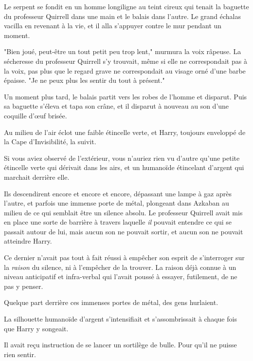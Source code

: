 Le serpent se fondit en un homme longiligne au teint cireux qui tenait la baguette du professeur Quirrell dans une main et le balais dans l'autre. Le grand échalas vacilla en revenant à la vie, et il alla s'appuyer contre le mur pendant un moment.

"Bien joué, peut-être un tout petit peu trop lent," murmura la voix râpeuse. La sécheresse du professeur Quirrell s'y trouvait, même si elle ne correspondait pas à la voix, pas plus que le regard grave ne correspondait au visage orné d'une barbe épaisse. "Je ne peux plus les sentir du tout à présent."

Un moment plus tard, le balais partit vers les robes de l'homme et disparut. Puis sa baguette s'éleva et tapa son crâne, et il disparut à nouveau au son d'une coquille d'œuf brisée.

Au milieu de l'air éclot une faible étincelle verte, et Harry, toujours enveloppé de la Cape d'Invisibilité, la suivit.

Si vous aviez observé de l'extérieur, vous n'auriez rien vu d'autre qu'une petite étincelle verte qui dérivait dans les airs, et un humanoïde étincelant d'argent qui marchait derrière elle.

\later

Ils descendirent encore et encore et encore, dépassant une lampe à gaz après l'autre, et parfois une immense porte de métal, plongeant dans Azkaban au milieu de ce qui semblait être un silence absolu. Le professeur Quirrell avait mis en place une sorte de barrière à travers laquelle \emph{il} pouvait entendre ce qui se passait autour de lui, mais aucun son ne pouvait sortir, et aucun son ne pouvait atteindre Harry.

Ce dernier n'avait pas tout à fait réussi à empêcher son esprit de s'interroger sur la \emph{raison} du silence, ni à l'empêcher de la trouver. La raison déjà connue à un niveau anticipatif et infra-verbal qui l'avait poussé à essayer, futilement, de ne pas y penser.

Quelque part derrière ces immenses portes de métal, des gens hurlaient.

La silhouette humanoïde d'argent s'intensifiait et s'assombrissait à chaque fois que Harry y songeait.

Il avait reçu instruction de se lancer un sortilège de bulle. Pour qu'il ne puisse rien sentir.

